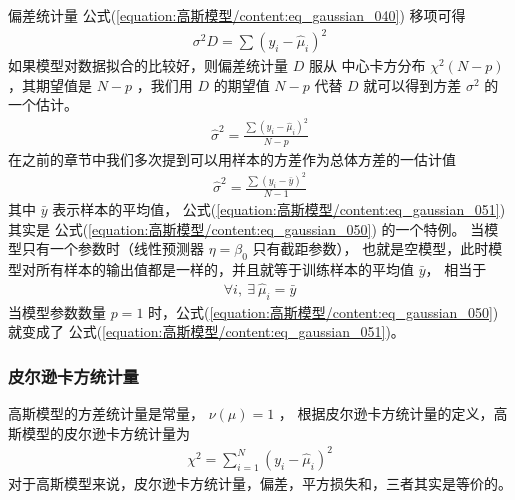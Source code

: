 \documentclass[letterpaper,10pt,english]{sphinxmanual}
\begin{document}
偏差统计量 公式(\ref{equation:高斯模型/content:eq_gaussian_040}) 移项可得
\begin{equation}\label{equation:高斯模型/content:高斯模型/content:24}
\begin{split}\sigma^2 D = \sum (y_i-\hat{\mu}_i)^2\end{split}
\end{equation}
如果模型对数据拟合的比较好，则偏差统计量 \(D\) 服从
中心卡方分布 \(\chi^2(N-p)\)
，其期望值是 \(N-p\)
，我们用 \(D\) 的期望值 \(N-p\) 代替 \(D\)
就可以得到方差 \(\sigma^2\) 的一个估计。
\begin{equation}\label{equation:高斯模型/content:eq_gaussian_050}
\begin{split}\hat{\sigma}^2 = \frac{\sum (y_i-\hat{\mu}_i)^2}{N-p}\end{split}
\end{equation}
在之前的章节中我们多次提到可以用样本的方差作为总体方差的一估计值
\begin{equation}\label{equation:高斯模型/content:eq_gaussian_051}
\begin{split}\hat{\sigma}^2 = \frac {\sum (y_i-\bar{y})^2}{N-1}\end{split}
\end{equation}
其中 \(\bar{y}\) 表示样本的平均值，
公式(\ref{equation:高斯模型/content:eq_gaussian_051}) 其实是 公式(\ref{equation:高斯模型/content:eq_gaussian_050}) 的一个特例。
当模型只有一个参数时（线性预测器 \(\eta=\beta_0\) 只有截距参数），
也就是空模型，此时模型对所有样本的输出值都是一样的，并且就等于训练样本的平均值 \(\bar{y}\)，
相当于
\begin{equation}\label{equation:高斯模型/content:高斯模型/content:25}
\begin{split}\forall i ,\
\exists \
\hat{\mu}_i = \bar{y}\end{split}
\end{equation}
当模型参数数量 \(p=1\) 时，公式(\ref{equation:高斯模型/content:eq_gaussian_050}) 就变成了 公式(\ref{equation:高斯模型/content:eq_gaussian_051})。


\subsubsection{皮尔逊卡方统计量}
\label{\detokenize{_u9ad8_u65af_u6a21_u578b/content:id9}}
高斯模型的方差统计量是常量，
\(\nu(\mu)=1\) ，
根据皮尔逊卡方统计量的定义，高斯模型的皮尔逊卡方统计量为
\begin{equation}\label{equation:高斯模型/content:高斯模型/content:26}
\begin{split}\chi^2 = \sum_{i=1}^N (y_i-\hat{\mu}_i)^2\end{split}
\end{equation}
对于高斯模型来说，皮尔逊卡方统计量，偏差，平方损失和，三者其实是等价的。
\end{document}
